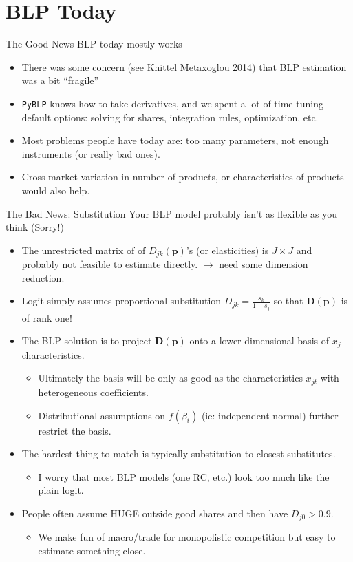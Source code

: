 \section{BLP Today}


\begin{frame}{The Good News}
BLP today mostly works
\begin{itemize}
    \item There was some concern (see Knittel Metaxoglou 2014) that BLP estimation was a bit ``fragile''
    \item \texttt{PyBLP} knows how to take derivatives, and we spent a lot of time tuning default options: solving for shares, integration rules, optimization, etc.
    \item Most problems people have today are: \alert{too many parameters, not enough instruments} (or really bad ones).
    \item Cross-market variation in number of products, or characteristics of products would also help.
\end{itemize}
\end{frame}

\begin{frame}{The Bad News: Substitution}
Your BLP model probably isn't as flexible as you think (Sorry!)
\begin{itemize}
\item The unrestricted matrix of of $D_{jk}(\mathbf{p})$'s (or elasticities) is $J \times J$ and probably not feasible to estimate directly. $\rightarrow$ need some \alert{dimension reduction}.
\item Logit simply assumes proportional substitution ${D}_{jk}=\frac{s_k}{1-s_{j}}$ so that $\mathbf{D}(\mathbf{p})$ is of rank one!
\item The BLP solution is to project $\mathbf{D}(\mathbf{p})$ onto a lower-dimensional basis of $x_{j}$ characteristics.
\begin{itemize}
\item Ultimately the basis will be only as good as the characteristics $x_{jt}$ with heterogeneous coefficients.
\item Distributional assumptions on $f(\beta_i)$ (ie: independent normal) further restrict the basis.
\end{itemize}
\item The hardest thing to match is typically \alert{substitution to closest substitutes}.
\begin{itemize}
\item I worry that most BLP models (one RC, etc.) look too much like the plain logit.
\end{itemize}
\item People often assume \alert{HUGE outside good shares} and then have $D_{j0}>0.9$.
\begin{itemize}
    \item We make fun of macro/trade for \alert{monopolistic competition} but easy to estimate something close.
\end{itemize}
\end{itemize}

\end{frame}


